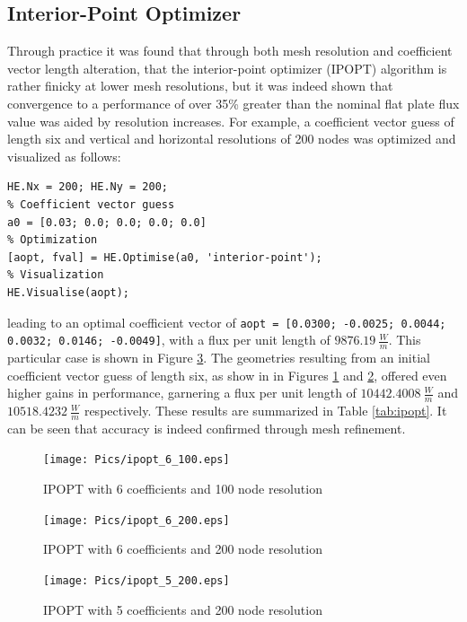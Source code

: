 \documentclass{article}
\begin{document}
\subsection{Interior-Point Optimizer}
Through practice it was found that through both mesh resolution and coefficient vector length alteration, that the interior-point optimizer (IPOPT) algorithm is rather finicky at lower mesh resolutions, but it was indeed shown that convergence to a performance of over 35\% greater than the nominal flat plate flux value was aided by resolution increases. For example, a coefficient vector guess of length six and vertical and horizontal resolutions of 200 nodes was optimized and visualized as follows:
\begin{lstlisting}[caption={Implementation}]
% Resolution
HE.Nx = 200; HE.Ny = 200;
% Coefficient vector guess
a0 = [0.03; 0.0; 0.0; 0.0; 0.0]
% Optimization
[aopt, fval] = HE.Optimise(a0, 'interior-point');
% Visualization
HE.Visualise(aopt);
\end{lstlisting}
leading to an optimal coefficient vector of \lstinline[]{aopt = [0.0300; -0.0025; 0.0044; 0.0032; 0.0146; -0.0049]}, with a flux per unit length of $9876.19~\frac{W}{m}$. This particular case is shown in Figure \ref{fig:ipopt_5_200}. The geometries resulting from an initial coefficient vector guess of length six, as show in in Figures \ref{fig:ipopt_6_100} and \ref{fig:ipopt_6_200}, offered even higher gains in performance, garnering a flux per unit length of $10442.4008~\frac{W}{m}$ and $10518.4232~\frac{W}{m}$ respectively. These results are summarized in Table \ref{tab:ipopt}. It can be seen that accuracy is indeed confirmed through mesh refinement.

\begin{figure}
    \centering
    \texttt{[image: Pics/ipopt\_6\_100.eps]}
    \caption{IPOPT with 6 coefficients and 100 node resolution}
    \label{fig:ipopt_6_100}
\end{figure}

\begin{figure}
    \centering
    \texttt{[image: Pics/ipopt\_6\_200.eps]}
    \caption{IPOPT with 6 coefficients and 200 node resolution}
    \label{fig:ipopt_6_200}
\end{figure}

\begin{figure}
    \centering
    \texttt{[image: Pics/ipopt\_5\_200.eps]}
    \caption{IPOPT with 5 coefficients and 200 node resolution}
    \label{fig:ipopt_5_200}
\end{figure}
\end{document}
